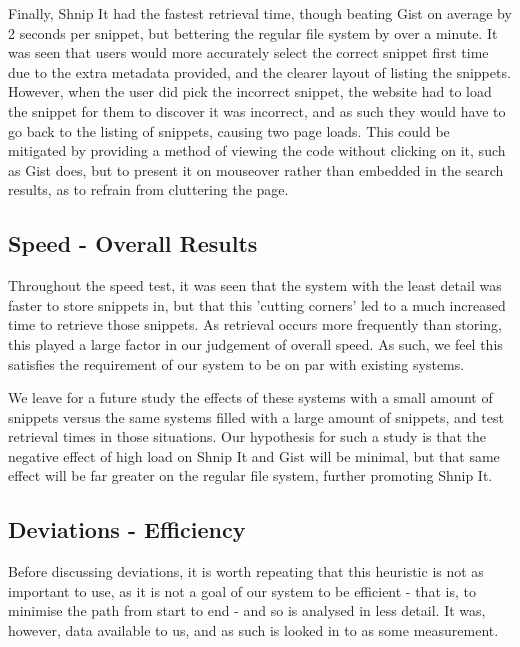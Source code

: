 Finally, Shnip It had the fastest retrieval time, though beating Gist on average by 2 seconds per snippet, but bettering the regular file system by over a minute.
It was seen that users would more accurately select the correct snippet first time due to the extra metadata provided, and the clearer layout of listing the snippets.
However, when the user did pick the incorrect snippet, the website had to load the snippet for them to discover it was incorrect, and as such they would have to go back to the listing of snippets, causing two page loads.
This could be mitigated by providing a method of viewing the code without clicking on it, such as Gist does, but to present it on mouseover rather than embedded in the search results, as to refrain from cluttering the page.

\subsection{Speed - Overall Results}
Throughout the speed test, it was seen that the system with the least detail was faster to store snippets in, but that this 'cutting corners' led to a much increased time to retrieve those snippets. 
As retrieval occurs more frequently than storing, this played a large factor in our judgement of overall speed.
As such, we feel this satisfies the requirement of our system to be on par with existing systems.

We leave for a future study the effects of these systems with a small amount of snippets versus the same systems filled with a large amount of snippets, and test retrieval times in those situations.
Our hypothesis for such a study is that the negative effect of high load on Shnip It and Gist will be minimal, but that same effect will be far greater on the regular file system, further promoting Shnip It.


\subsection{Deviations - Efficiency}
Before discussing deviations, it is worth repeating that this heuristic is not as important to use, as it is not a goal of our system to be efficient - that is, to minimise the path from start to end - and so is analysed in less detail.
It was, however, data available to us, and as such is looked in to as some measurement.

